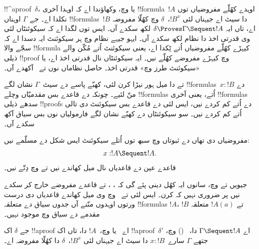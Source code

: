 \documentclass[../../../include/open-logic-section]{subfiles}
\begin{document}


!!^a{proof}~$\delta$،  یا  وچ، وکھاؤندا اے کہ اوہدا آخری !!{formula}~$!A$ اوہدے کھُلّے مفروضیاں توں نکلدا اے۔ جے $\Gamma$ اوہناں !!{formula}s~$!B$ دا سیٹ اے جیہناں لئی $!B^x$،~$\delta$ وچ کھُلّا مفروضہ اے، تاں ایہ $\delta \Proves \Gamma
\Sequent !A$ لکھ سکدے آں۔ ایس توں لگدا اے کہ سیکوئنٹاں لئی وی قدرتی اخذ دا نظام لکھ سکدے آں۔ ایہو جیہے نظام وچ ہر سیکوئنٹ ایہ دسدا اے کہ سجّے والا !!{formula} کیہڑے کھُلّے مفروضیاں اُتے ٹِکدا اے، یعنی سیکوئنٹ اُتے مُکّن والے ذیلی !!{proof} وچ کیہڑے مفروضے کھُلّے نیں۔ ایہ سیکوئنٹاں نال قدرتی اخذ اے، یا «سیکوئنٹ طرز وچ» قدرتی اخذ۔ حاصل نظاماں نوں  تے~ آکھدے آں۔

 تے  دا میل ہور نیڑا کرن لئی، کھبّے پاسے دے سیٹ~$\Gamma$ نشان لگے !!{formula}s~$x:!B$ دے منّ لئیے۔ چونکہ  دے قاعدے بس مقدمیّاں وچلے !!{formula}s اُتے، یعنی آخری !!{formula}s سدھے ذیلی !!{proof}s دے اُتے کم کردے نیں، ایس لئی  دے قاعدے بس سیکوئنٹ دی تالی اُتے کم کردے نیں۔ سو سیکوئنٹاں دے کھبّے نشان لگے فارمولیاں نوں بس سیاق آکھ سکدے آں۔

مفروضیاں دی تھاں  دے ثبوتاں وچ سبھ توں اُتلے سیکوئنٹ ایس شکل دے مسلّمے نیں:
\[x:!A \Sequent !A.\]
قاعدے عین  دے قاعدیاں نال میل کھاندے نیں تے  وچ دِتّے نیں۔



جیویں  تے  وچ، سانوں ایہ کھُل دینی پئے گی کہ \Intro{\lif}، \Intro{\lnot}، \Elim{\lor} تے \Elim{\lexists} قاعدے مفروضے خارج کر سکدے نیں پر ضروری نہیں کہ کرن۔ ایس لئی  تے~ وچ وی میل کھاندے قاعدیاں دی درست ورتوں اوہدوں منّنے آں جدوں سیاق دے متعلقہ !!{formula}s $!A$، $!B$ تے $!A(a)$ متعلقہ مقدمے دے سیاق وچ موجود نہیں۔

\begin{prop}
جے $\delta$ اک !!a{proof} اے~ یا  وچ،~$!A$ دا، تاں اک !!a{proof}~$\delta'$ اے $\Gamma \Sequent !A$ دا،~ () وچ، جتھے $\Gamma$ سارے~$x:!B$ دا سیٹ اے جیہناں لئی $!B^x$،~$\delta$ دا کھُلّا مفروضہ اے۔
\end{prop}
\end{document}
